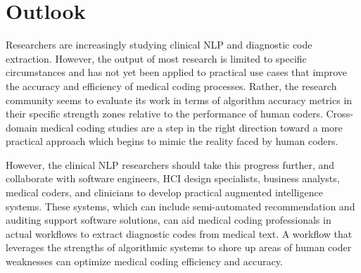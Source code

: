 \documentclass[sigconf]{acmart}
\begin{document}
\section{Outlook}
Researchers are increasingly studying clinical NLP and diagnostic code extraction. However, the output of most research is limited to specific circumstances and has not yet been applied to practical use cases that improve the accuracy and efficiency of medical coding processes. Rather, the research community seems to evaluate its work in terms of algorithm accuracy metrics in their specific strength zones relative to the performance of human coders. Cross-domain medical coding studies are a step in the right direction toward a more practical approach which begins to mimic the reality faced by human coders.

However, the clinical NLP researchers should take this progress further, and collaborate with software engineers, HCI design specialists, business analysts, medical coders, and clinicians to develop practical augmented intelligence systems. These systems, which can include semi-automated recommendation and auditing support software solutions, can aid medical coding professionals in actual workflows to extract diagnostic codes from medical text. A workflow that leverages the strengths of algorithmic systems to shore up areas of human coder weaknesses can optimize medical coding efficiency and accuracy.

 


\end{document}
